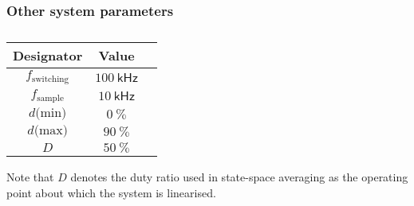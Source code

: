\subsubsection{Other system parameters}
\begin{table}[H]
\centering
\begin{tabular}{|c|c|c|}
\hline
Designator & Value\\
\hline
$f_\text{switching}$ & $100 \ \mathsf{kHz}$\\
\hline
$f_\text{sample}$ & $10 \ \mathsf{kHz}$\\
\hline
$d \text{(min)}$ & $0 \ \mathsf{\%}$\\
\hline
$d \text{(max)}$ & $90 \ \mathsf{\%}$\\
\hline
$D$ & $50 \ \mathsf{\%}$\\
\hline
\end{tabular}
\caption{}
\label{tab:system_values}
\end{table}
Note that $D$ denotes the duty ratio used in state-space averaging as the operating point about which the system is linearised.
